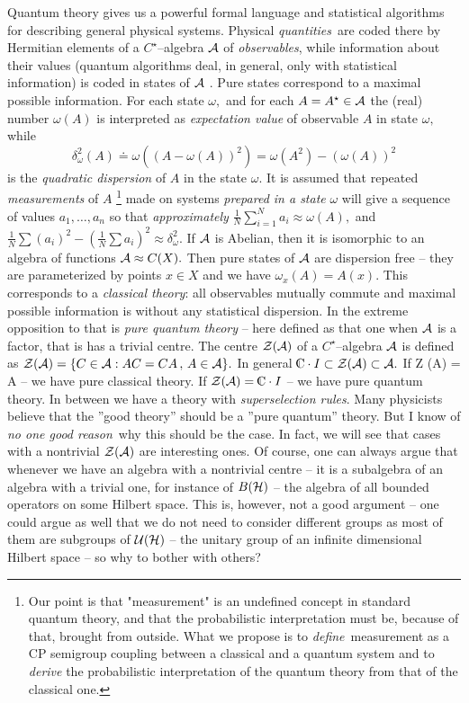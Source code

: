 \documentclass[12pt]{article}
\def\complex{{\kern .1em {\raise .47ex \hbox
{$\scriptscriptstyle
|$}}
\kern -.4em {\rm C}}}
\begin{document}
Quantum theory gives us a powerful formal language and
statistical algorithms for
describing general physical systems.
Physical {\sl quantities}\ are coded there by
Hermitian elements of a $C^{\star }$--algebra ${\cal A}$ of {\sl observables}, 
while information about their values  (quantum algorithms deal,  in general, 
only with statistical information)  is coded in states of 
${\cal A}$ .  Pure states correspond to a maximal possible information.  For
each state $\omega , $ and for each $A=A^{\star }\in {\cal A}$ the  (real)
number
$\omega
 (A)$ is interpreted as {\sl expectation value} of observable $A$ in state $
\omega , $ while 
$$
\delta _\omega ^2 (A)\doteq \omega  ( (A-\omega  (A))^2)=\omega 
 (A^2)- (\omega  (A))^2 
$$
is the {\sl quadratic dispersion} of $A$ in the state $\omega . $ It is assumed
that repeated {\sl measurements} of $A$
\footnote{Our point is that "measurement" is an undefined concept in
standard quantum theory, and that the probabilistic interpretation
must be, because of that, brought from outside. What we propose
is to {\sl define}\, measurement as a CP semigroup coupling between a
classical and a quantum system and to {\sl derive} the probabilistic
interpretation of the quantum theory from that of the classical one.}
made on systems 
{\sl prepared in a state} $
\omega $ will give a sequence of values $a_1, \ldots , a_n$ so that 
{\sl approximately} ${\frac
1N}\sum_{i=1}^Na_i\approx \omega  (A), $ and ${\frac 1N}\sum  (a_i)^2- ({\frac 1N
}\sum a_i)^2\approx \delta _\omega ^2. $ If ${\cal A}$ is Abelian,  then it is
isomorphic to an algebra of functions ${\cal A}\approx C (X). $ Then pure
states of ${\cal A}$ are dispersion free -- they are parameterized by points $
x\in X$ and we have $\omega _x (A)=A (x). $ This corresponds to a {\sl classical
theory}:  all observables mutually commute and maximal possible information
is without any statistical dispersion.  In the extreme opposition to that is
{\sl pure quantum theory} -- here defined as that one 
when ${\cal A}$ is a factor, that is has a trivial centre.  The centre
${\cal Z (A)}$ of a $C^\star$--algebra ${\cal A}$ is defined as
${\cal Z (A)}=\{C\in {\cal A}
: AC=CA\, , \, A\in {\cal A}\}. $ In general $\complex \cdot I\subset {\cal Z (A)}
\subset 
{\cal A}. $ If {\cal Z (A) = A} -- we have pure classical theory.  If ${\cal 
Z (A)}=\complex \cdot I$ -- we have pure quantum theory.  In between we have 
a theory
with {\sl superselection rules}.  Many physicists believe that the ''good
theory'' should be a ''pure quantum'' theory.  But I know of {\sl no one good
 reason}\
why this should be the case.  In fact,  we will see that cases with a
nontrivial ${\cal Z (A)}$ are interesting ones.  Of course,  one can always
argue that whenever we have an algebra with a nontrivial centre -- it is a
subalgebra of an algebra with a trivial one,  for instance of $B ({\cal H})$
-- the algebra of all bounded operators on some Hilbert space.  This is,
however, not a good argument -- one could argue as well that we do not need
to consider different groups as most of them are subgroups of ${\cal U (H)}$
-- the unitary group of an infinite dimensional Hilbert space -- so why
to bother with others?
\end{document}
